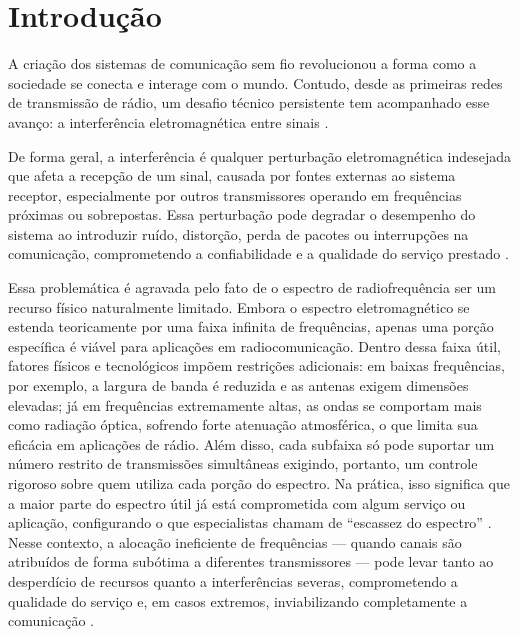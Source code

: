 \chapter{Introdução}
\label{cap:introducao}

A criação dos sistemas de comunicação sem fio revolucionou a forma como a sociedade se conecta e interage com o mundo. Contudo, desde as primeiras redes de transmissão de rádio, um desafio técnico persistente tem acompanhado esse avanço: a interferência eletromagnética entre sinais \cite{kaur2011electromagnetic}. 


De forma geral, a interferência é qualquer perturbação eletromagnética indesejada que afeta a recepção de um sinal, causada por fontes externas ao sistema receptor, especialmente por outros transmissores operando em frequências próximas ou sobrepostas. Essa perturbação pode degradar o desempenho do sistema ao introduzir ruído, distorção, perda de pacotes ou interrupções na comunicação, comprometendo a confiabilidade e a qualidade do serviço prestado \cite{ott2011electromagnetic}.

Essa problemática é agravada pelo fato de o espectro de radiofrequência ser um recurso físico naturalmente limitado. Embora o espectro eletromagnético se estenda teoricamente por uma faixa infinita de frequências, apenas uma porção específica é viável para aplicações em radiocomunicação. Dentro dessa faixa útil, fatores físicos e tecnológicos impõem restrições adicionais: em baixas frequências, por exemplo, a largura de banda é reduzida e as antenas exigem dimensões elevadas; já em frequências extremamente altas, as ondas se comportam mais como radiação óptica, sofrendo forte atenuação atmosférica, o que limita sua eficácia em aplicações de rádio. Além disso, cada subfaixa só pode suportar um número restrito de transmissões simultâneas exigindo, portanto, um controle rigoroso sobre quem utiliza cada porção do espectro. Na prática, isso significa que a maior parte do espectro útil já está comprometida com algum serviço ou aplicação, configurando o que especialistas chamam de “escassez do espectro” \cite{mitola1999cognitive}. Nesse contexto, a alocação ineficiente de frequências — quando canais são atribuídos de forma subótima a diferentes transmissores — pode levar tanto ao desperdício de recursos quanto a interferências severas, comprometendo a qualidade do serviço e, em casos extremos, inviabilizando completamente a comunicação \cite{viegas2015radios}.

